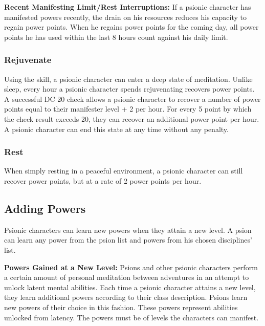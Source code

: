 \textbf{Recent Manifesting Limit/Rest Interruptions:} If a psionic character has manifested powers recently, the drain on his resources reduces his capacity to regain power points. When he regains power points for the coming day, all power points he has used within the last 8 hours count against his daily limit.

\subsubsection{Rejuvenate}
Using the  skill, a psionic character can enter a deep state of meditation. Unlike sleep, every hour a psionic character spends rejuvenating recovers power points. A successful  DC 20 check allows a psionic character to recover a number of power points equal to their manifester level + 2 per hour. For every 5 point by which the check result exceeds 20, they can recover an additional power point per hour. A psionic character can end this state at any time without any penalty.

\subsubsection{Rest}
When simply resting in a peaceful environment, a psionic character can still recover power points, but at a rate of 2 power points per hour.

\subsection{Adding Powers}
Psionic characters can learn new powers when they attain a new level. A psion can learn any power from the psion list and powers from his chosen disciplines' list. %

\textbf{Powers Gained at a New Level:} Psions and other psionic characters perform a certain amount of personal meditation between adventures in an attempt to unlock latent mental abilities. Each time a psionic character attains a new level, they learn additional powers according to their class description. Psions learn new powers of their choice in this fashion. These powers represent abilities unlocked from latency. The powers must be of levels the characters can manifest.

